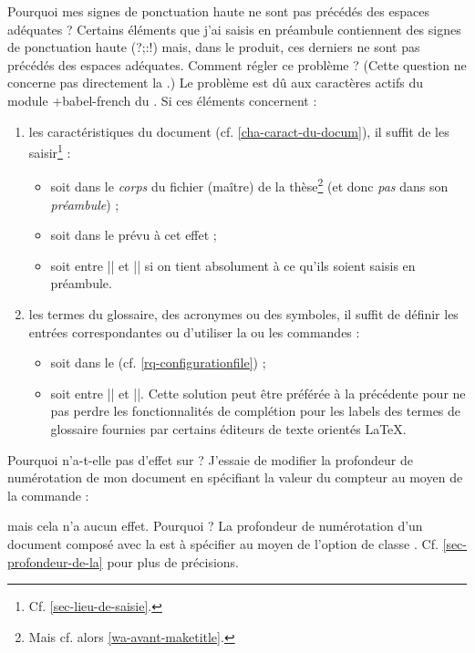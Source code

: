 \begin{dbfaq}{Pourquoi mes signes de ponctuation haute ne sont pas précédés des
    espaces adéquates ?}{}
  Certains éléments que j'ai saisis en préambule contiennent des signes de
  ponctuation haute ({\NoAutoSpacing?;:!}) mais, dans le \pdf{} produit, ces
  derniers ne sont pas précédés des espaces adéquates. Comment régler ce
  problème ?
  \tcblower
  (Cette question ne concerne pas directement la \yatCl{}.) Le problème est dû
  aux caractères actifs du module \package*+{babel-french} du
  . Si ces éléments concernent :
  \begin{enumerate}
  \item les caractéristiques du document (cf. \vref{cha-caract-du-docum}), il
    suffit de les saisir\footnote{Cf. \vref{sec-lieu-de-saisie}.} :
    \begin{itemize}
    \item soit dans le \emph{corps} du fichier (maître) de la
      thèse\footnote{Mais cf. alors \vref{wa-avant-maketitle}.} (et donc
      \emph{pas} dans son \emph{préambule}) ;
    \item soit dans le \File{\characteristicsfile} prévu à cet effet ;
    \item soit entre || et || si on tient
      absolument à ce qu'ils soient saisis en préambule.
    \end{itemize}
  \item les termes du glossaire, des acronymes ou des symboles, il suffit de
    définir les entrées correspondantes ou d'utiliser la ou les commandes
     :
    \begin{itemize}
    \item soit dans le \File{\configurationfile}
      (cf. \vref{rq-configurationfile}) ;
    \item soit entre || et ||. Cette
      solution peut être préférée à la précédente pour ne pas perdre les
      fonctionnalités de complétion pour les labels des termes de glossaire
      fournies par certains éditeurs de texte orientés \LaTeX{}.
    \end{itemize}
  \end{enumerate}
\end{dbfaq}

\begin{dbfaq}{Pourquoi \protect{} n'a-t-elle pas
    d'effet sur \protect{} ?}{}
  J'essaie de modifier la profondeur de numérotation de mon document en
  spécifiant la valeur du compteur  au moyen de la
  commande :
\begin{preamblecode}
\end{preamblecode}
  mais cela n'a aucun effet. Pourquoi ?
  \tcblower
  La profondeur de numérotation d'un document composé avec la \yatCl{} est
  à spécifier au moyen de l'option de classe
  . Cf. \vref{sec-profondeur-de-la} pour plus de
  précisions.
\end{dbfaq}

